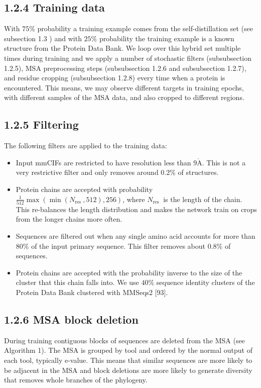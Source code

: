 \documentclass[10pt]{article}
\def\AA{\mathring{\mathrm{A}}}
\begin{document}
\subsection*{1.2.4 Training data}
With $75 \%$ probability a training example comes from the self-distillation set (see subsection 1.3 ) and with $25 \%$ probability the training example is a known structure from the Protein Data Bank. We loop over this hybrid set multiple times during training and we apply a number of stochastic filters (subsubsection 1.2.5), MSA preprocessing steps (subsubsection 1.2.6 and subsubsection 1.2.7), and residue cropping (subsubsection 1.2.8) every time when a protein is encountered. This means, we may observe different targets in training epochs, with different samples of the MSA data, and also cropped to different regions.

\subsection*{1.2.5 Filtering}
The following filters are applied to the training data:

\begin{itemize}
  \item Input mmCIFs are restricted to have resolution less than $9 \AA$. This is not a very restrictive filter and only removes around $0.2 \%$ of structures.
  \item Protein chains are accepted with probability $\frac{1}{512} \max \left(\min \left(N_{\text {res }}, 512\right), 256\right)$, where $N_{\text {res }}$ is the length of the chain. This re-balances the length distribution and makes the network train on crops from the longer chains more often.
  \item Sequences are filtered out when any single amino acid accounts for more than $80 \%$ of the input primary sequence. This filter removes about $0.8 \%$ of sequences.
  \item Protein chains are accepted with the probability inverse to the size of the cluster that this chain falls into. We use $40 \%$ sequence identity clusters of the Protein Data Bank clustered with MMSeqs2 [93].
\end{itemize}

\subsection*{1.2.6 MSA block deletion}
During training contiguous blocks of sequences are deleted from the MSA (see Algorithm 1). The MSA is grouped by tool and ordered by the normal output of each tool, typically e-value. This means that similar sequences are more likely to be adjacent in the MSA and block deletions are more likely to generate diversity that removes whole branches of the phylogeny.
\end{document}
